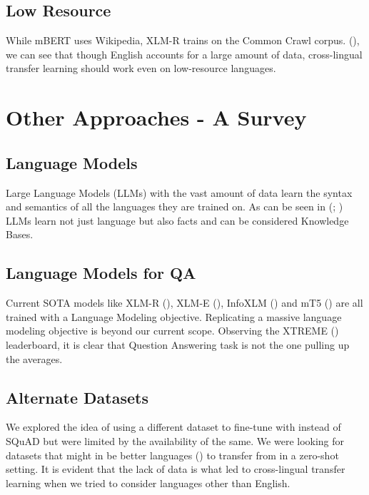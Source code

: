 \documentclass[12pt]{article}   %
\begin{document}
\subsection{Low Resource}
While mBERT uses Wikipedia, XLM-R trains on the Common Crawl corpus. (\cite{wu-dredze-2020-languages}), we can see that though English accounts for a large amount of data, cross-lingual transfer learning should work even on low-resource languages.

\section{Other Approaches - A Survey}
\subsection{Language Models}
Large Language Models (LLMs) with the vast amount of data learn the syntax and semantics of all the languages they are trained on. As can be seen in (\cite{petroni-etal-2019-language}; \cite{mulfew}) LLMs learn not just language but also facts and can be considered Knowledge Bases.

\subsection{Language Models for QA}
Current SOTA models like XLM-R (\cite{conneau2019unsupervised}), XLM-E (\cite{chi2021xlm}), InfoXLM (\cite{chi-etal-2021-infoxlm}) and mT5 (\cite{xue-etal-2021-mt5}) are all trained with a Language Modeling objective. Replicating a massive language modeling objective is beyond our current scope. Observing the XTREME (\cite{xtreme}) leaderboard, it is clear that Question Answering task is not the one pulling up the averages.  

\subsection{Alternate Datasets}
We explored the idea of using a different dataset to fine-tune with instead of SQuAD but were limited by the availability of the same. We were looking for datasets that might in be better languages (\cite{lin-etal-2019-choosing}) to transfer from in a zero-shot setting. It is evident that the lack of data is what led to cross-lingual transfer learning when we tried to consider languages other than English. 

\end{document}
